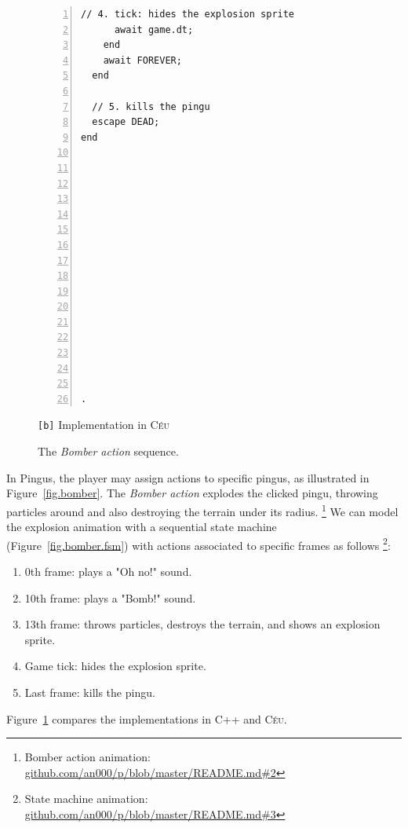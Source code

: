 \documentclass{vgtc}                          %
\newcommand{\CEU}{\textsc{C\'{e}u}\xspace}
\newcommand{\code}[1] {{\small{\texttt{#1}}}}
\newcommand{\bx}{\code{[b]}\xspace}
\begin{document}
\begin{figure}[th!]
\begin{minipage}[t]{0.50\linewidth}
\begin{lstlisting}[numbers=left,xleftmargin=3em]
      // 4. tick: hides the explosion sprite
      await game.dt;
    end
    await FOREVER;
  end

  // 5. kills the pingu
  escape DEAD;
end
















.
\end{lstlisting}
\centering\small{\bx Implementation in \CEU}
\end{minipage}
\caption{ The \emph{Bomber action} sequence.
\label{lst.bomber}
}
\end{figure}

In Pingus, the player may assign actions to specific pingus, as illustrated in
Figure~\ref{fig.bomber}.
%
The \emph{Bomber action} explodes the clicked pingu, throwing particles around
and also destroying the terrain under its radius.%
\footnote{Bomber action animation: \url{github.com/an000/p/blob/master/README.md#2} }
%
We can model the explosion animation with a sequential state machine
(Figure~\ref{fig.bomber.fsm}) with actions associated to specific frames as
follows%
\footnote{State machine animation: \url{github.com/an000/p/blob/master/README.md#3} }:
%
\begin{enumerate}
\item 0th frame:  plays a "Oh no!" sound.
\item 10th frame: plays a "Bomb!" sound.
\item 13th frame: throws particles, destroys the terrain, and shows an
                  explosion sprite.
\item Game tick:  hides the explosion sprite.
\item Last frame: kills the pingu.
\end{enumerate}

Figure~\ref{lst.bomber} compares the implementations in C++ and \CEU.
\end{document}

